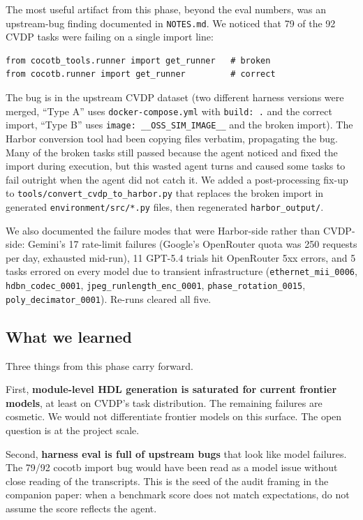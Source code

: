 \documentclass{article}
\begin{document}
The most useful artifact from this phase, beyond the eval numbers, was an upstream-bug
finding documented in \texttt{NOTES.md}. We noticed that 79 of the 92 CVDP tasks were
failing on a single import line:
\begin{lstlisting}
from cocotb_tools.runner import get_runner   # broken
from cocotb.runner import get_runner         # correct
\end{lstlisting}
The bug is in the upstream CVDP dataset (two different harness versions were merged,
``Type A'' uses \texttt{docker-compose.yml} with \texttt{build: .} and the correct import,
``Type B'' uses \texttt{image: \_\_OSS\_SIM\_IMAGE\_\_} and the broken import). The Harbor
conversion tool had been copying files verbatim, propagating the bug. Many of the
broken tasks still passed because the agent noticed and fixed the import during execution,
but this wasted agent turns and caused some tasks to fail outright when the agent did not
catch it. We added a post-processing fix-up to \texttt{tools/convert\_cvdp\_to\_harbor.py}
that replaces the broken import in generated \texttt{environment/src/*.py} files, then
regenerated \texttt{harbor\_output/}.

We also documented the failure modes that were Harbor-side rather than CVDP-side: Gemini's
17 rate-limit failures (Google's OpenRouter quota was 250 requests per day, exhausted
mid-run), 11 GPT-5.4 trials hit OpenRouter 5xx errors, and 5 tasks errored on every model
due to transient infrastructure (\texttt{ethernet\_mii\_0006}, \texttt{hdbn\_codec\_0001},
\texttt{jpeg\_runlength\_enc\_0001}, \texttt{phase\_rotation\_0015},
\texttt{poly\_decimator\_0001}). Re-runs cleared all five.

\subsection{What we learned}

Three things from this phase carry forward.

First, \textbf{module-level HDL generation is saturated for current frontier models}, at
least on CVDP's task distribution. The remaining failures are cosmetic. We would not
differentiate frontier models on this surface. The open question is at the project scale.

Second, \textbf{harness eval is full of upstream bugs} that look like model failures. The
79/92 cocotb import bug would have been read as a model issue without close reading of the
transcripts. This is the seed of the audit framing in the companion paper: when a benchmark
score does not match expectations, do not assume the score reflects the agent.
\end{document}
